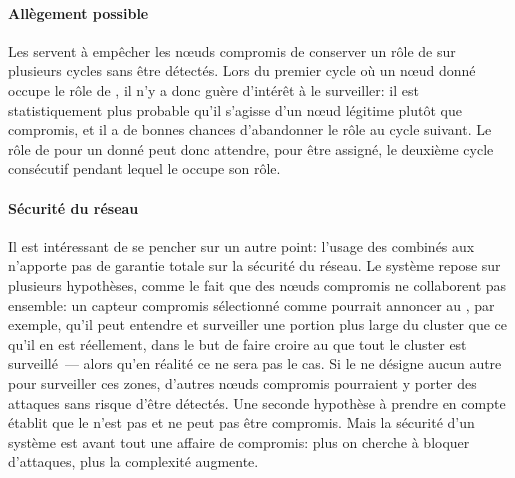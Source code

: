 \paragraph{Allègement possible}
Les \vns servent à empêcher les nœuds compromis de conserver un rôle de \cn sur plusieurs cycles sans être détectés.
Lors du premier cycle où un nœud donné occupe le rôle de \cn, il n'y a donc guère d'intérêt à le surveiller: il est statistiquement plus probable qu'il s'agisse d'un nœud légitime plutôt que compromis, et il a de bonnes chances d'abandonner le rôle au cycle suivant.
Le rôle de \vn pour un \cn donné peut donc attendre, pour être assigné, le deuxième cycle consécutif pendant lequel le \cn occupe son rôle.

\paragraph{Sécurité du réseau}
Il est intéressant de se pencher sur un autre point: l'usage des \cns combinés aux \vns n'apporte pas de garantie totale sur la sécurité du réseau.
Le système repose sur plusieurs hypothèses, comme le fait que des nœuds compromis ne collaborent pas ensemble: un capteur compromis sélectionné comme \cn pourrait annoncer au \ch, par exemple, qu'il peut entendre et surveiller une portion plus large du cluster que ce qu'il en est réellement, dans le but de faire croire au \CH que tout le cluster est surveillé~--- alors qu'en réalité ce ne sera pas le cas.
Si le \CH ne désigne aucun autre \cn pour surveiller ces zones, d'autres nœuds compromis pourraient y porter des attaques sans risque d'être détectés.
Une seconde hypothèse à prendre en compte établit que le \ch n'est pas et ne peut pas être compromis. 
Mais la sécurité d'un système est avant tout une affaire de compromis: plus on cherche à bloquer d'attaques, plus la complexité augmente.
